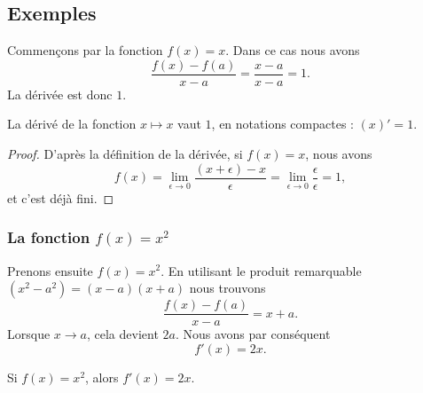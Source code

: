 \subsection{Exemples}

\begin{example}
    Commençons par la fonction $f(x)=x$. Dans ce cas nous avons
    \begin{equation}
        \frac{ f(x)-f(a) }{ x-a }=\frac{ x-a }{ x-a }=1.
    \end{equation}
    La dérivée est donc $1$.
\end{example}

\begin{proposition}
    La dérivé de la fonction $x\mapsto x$ vaut $1$, en notations compactes : $(x)'=1$.
\end{proposition}

\begin{proof}
    D'après la définition de la dérivée, si $f(x)=x$, nous avons
    \begin{equation}
        f(x)=\lim_{\epsilon\to 0}\frac{ (x+\epsilon) -x }{\epsilon} =\lim_{\epsilon\to 0}\frac{ \epsilon }{\epsilon} =1,
    \end{equation}
    et c'est déjà fini.
\end{proof}

\subsubsection{La fonction $f(x)=x^2$}

Prenons ensuite $f(x)=x^2$. En utilisant le produit remarquable $(x^2-a^2)=(x-a)(x+a)$ nous trouvons
\begin{equation}
	\frac{ f(x)-f(a) }{ x-a }=x+a.
\end{equation}
Lorsque $x\to a$, cela devient $2a$. Nous avons par conséquent
\begin{equation}
	f'(x)=2x.
\end{equation}

\begin{lemma}           \label{LemDeccCarr}
    Si $f(x)=x^2$, alors $f'(x)=2x$.
\end{lemma}


